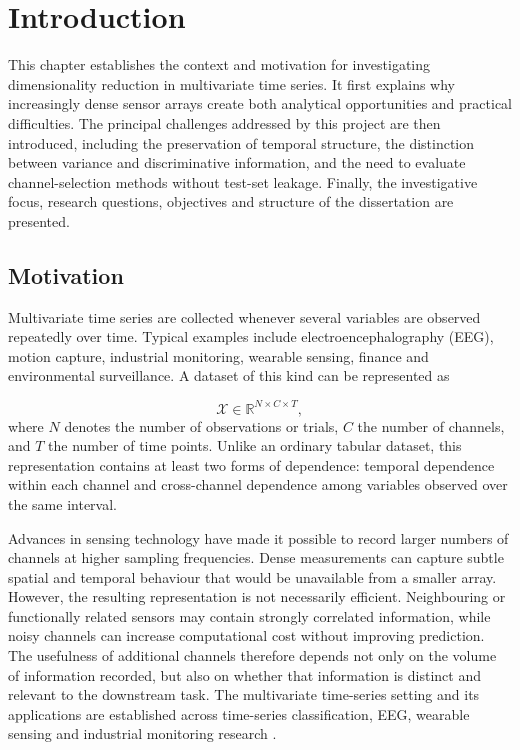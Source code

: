 \chapter{Introduction}
\label{chap:introduction}

This chapter establishes the context and motivation for investigating dimensionality reduction in multivariate time series. It first explains why increasingly dense sensor arrays create both analytical opportunities and practical difficulties. The principal challenges addressed by this project are then introduced, including the preservation of temporal structure, the distinction between variance and discriminative information, and the need to evaluate channel-selection methods without test-set leakage. Finally, the investigative focus, research questions, objectives and structure of the dissertation are presented.


\section{Motivation}

Multivariate time series are collected whenever several variables are observed repeatedly over time. Typical examples include electroencephalography (EEG), motion capture, industrial monitoring, wearable sensing, finance and environmental surveillance. A dataset of this kind can be represented as


\begin{equation}
    \mathcal{X}\in\mathbb{R}^{N\times C\times T},
    \label{eq:mts-tensor-intro}
\end{equation}
where $N$ denotes the number of observations or trials, $C$ the number of channels, and $T$ the number of time points. Unlike an ordinary tabular dataset, this representation contains at least two forms of dependence: temporal dependence within each channel and cross-channel dependence among variables observed over the same interval.

Advances in sensing technology have made it possible to record larger numbers of channels at higher sampling frequencies. Dense measurements can capture subtle spatial and temporal behaviour that would be unavailable from a smaller array. However, the resulting representation is not necessarily efficient. Neighbouring or functionally related sensors may contain strongly correlated information, while noisy channels can increase computational cost without improving prediction. The usefulness of additional channels therefore depends not only on the volume of information recorded, but also on whether that information is distinct and relevant to the downstream task. The multivariate time-series setting and its applications are established
across time-series classification, EEG, wearable sensing and industrial
monitoring research
\citep{bagnall2017bakeoff,ruiz2021multivariate,nunez2006eeg,
bulling2014activity,qin2012process}.

